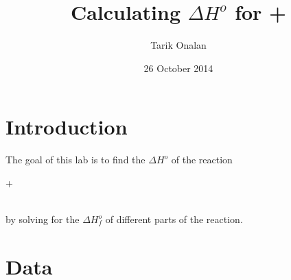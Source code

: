 \documentclass{article}
\title{Calculating \(\Delta{H^{o}}\) for \ce{NH4Cl}+\ce{NaOH}}
\date{26 October 2014}
\author{Tarik Onalan}
\begin{document}
    \maketitle
    \section{Introduction}
        The goal of this lab is to find the \(\Delta{H^{o}}\) of the reaction\\
        \centerline{+}\\
        by solving for the \(\Delta{H^{o}_{f}}\) of different parts of the reaction.
    \section{Data}
\end{document}
